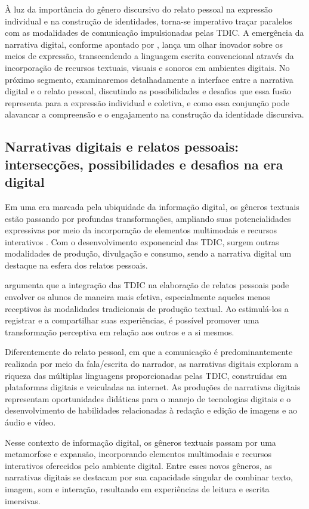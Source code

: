 \documentclass[portuguese]{textolivre}
\begin{document}
À luz da importância do gênero discursivo do relato pessoal na expressão individual e na construção de identidades, torna-se imperativo traçar paralelos com as modalidades de comunicação impulsionadas pelas TDIC. A emergência da narrativa digital, conforme apontado por \textcite{ryan2009narrative}, lança um olhar inovador sobre os meios de expressão, transcendendo a linguagem escrita convencional através da incorporação de recursos textuais, visuais e sonoros em ambientes digitais. No próximo segmento, examinaremos detalhadamente a interface entre a narrativa digital e o relato pessoal, discutindo as possibilidades e desafios que essa fusão representa para a expressão individual e coletiva, e como essa conjunção pode alavancar a compreensão e o engajamento na construção da identidade discursiva.


\subsection{Narrativas digitais e relatos pessoais: intersecções, possibilidades e desafios na era digital}

Em uma era marcada pela ubiquidade da informação digital, os gêneros textuais estão passando por profundas transformações, ampliando suas potencialidades expressivas por meio da incorporação de elementos multimodais e recursos interativos \cite{rojo2012}. Com o desenvolvimento exponencial das TDIC, surgem outras modalidades de produção, divulgação e consumo, sendo a narrativa digital um destaque na esfera dos relatos pessoais.

\textcite{miller2010make} argumenta que a integração das TDIC na elaboração de relatos pessoais pode envolver os alunos de maneira mais efetiva, especialmente aqueles menos receptivos às modalidades tradicionais de produção textual. Ao estimulá-los a registrar e a compartilhar suas experiências, é possível promover uma transformação perceptiva em relação aos outros e a si mesmos.

Diferentemente do relato pessoal, em que a comunicação é predominantemente realizada por meio da fala/escrita do narrador, as narrativas digitais exploram a riqueza das múltiplas linguagens proporcionadas pelas TDIC, construídas em plataformas digitais e veiculadas na internet. As produções de narrativas digitais representam oportunidades didáticas para o manejo de tecnologias digitais e o desenvolvimento de habilidades relacionadas à redação e edição de imagens e ao áudio e vídeo.

Nesse contexto de informação digital, os gêneros textuais passam por uma metamorfose e expansão, incorporando elementos multimodais e recursos interativos oferecidos pelo ambiente digital. Entre esses novos gêneros, as narrativas digitais se destacam por sua capacidade singular de combinar texto, imagem, som e interação, resultando em experiências de leitura e escrita imersivas.
\end{document}
